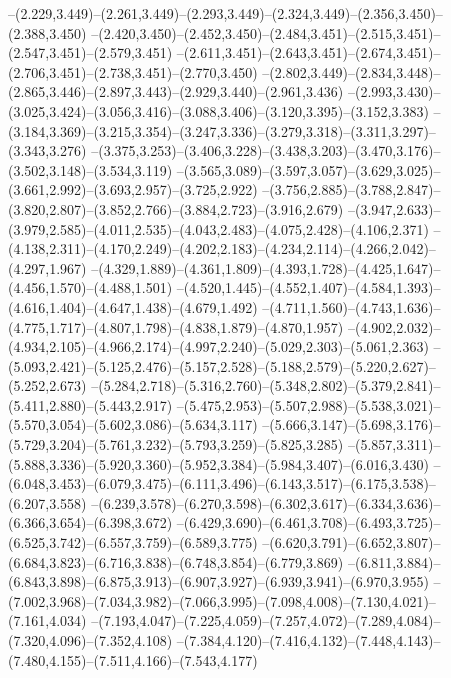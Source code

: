   --(2.229,3.449)--(2.261,3.449)--(2.293,3.449)--(2.324,3.449)--(2.356,3.450)--(2.388,3.450)%
  --(2.420,3.450)--(2.452,3.450)--(2.484,3.451)--(2.515,3.451)--(2.547,3.451)--(2.579,3.451)%
  --(2.611,3.451)--(2.643,3.451)--(2.674,3.451)--(2.706,3.451)--(2.738,3.451)--(2.770,3.450)%
  --(2.802,3.449)--(2.834,3.448)--(2.865,3.446)--(2.897,3.443)--(2.929,3.440)--(2.961,3.436)%
  --(2.993,3.430)--(3.025,3.424)--(3.056,3.416)--(3.088,3.406)--(3.120,3.395)--(3.152,3.383)%
  --(3.184,3.369)--(3.215,3.354)--(3.247,3.336)--(3.279,3.318)--(3.311,3.297)--(3.343,3.276)%
  --(3.375,3.253)--(3.406,3.228)--(3.438,3.203)--(3.470,3.176)--(3.502,3.148)--(3.534,3.119)%
  --(3.565,3.089)--(3.597,3.057)--(3.629,3.025)--(3.661,2.992)--(3.693,2.957)--(3.725,2.922)%
  --(3.756,2.885)--(3.788,2.847)--(3.820,2.807)--(3.852,2.766)--(3.884,2.723)--(3.916,2.679)%
  --(3.947,2.633)--(3.979,2.585)--(4.011,2.535)--(4.043,2.483)--(4.075,2.428)--(4.106,2.371)%
  --(4.138,2.311)--(4.170,2.249)--(4.202,2.183)--(4.234,2.114)--(4.266,2.042)--(4.297,1.967)%
  --(4.329,1.889)--(4.361,1.809)--(4.393,1.728)--(4.425,1.647)--(4.456,1.570)--(4.488,1.501)%
  --(4.520,1.445)--(4.552,1.407)--(4.584,1.393)--(4.616,1.404)--(4.647,1.438)--(4.679,1.492)%
  --(4.711,1.560)--(4.743,1.636)--(4.775,1.717)--(4.807,1.798)--(4.838,1.879)--(4.870,1.957)%
  --(4.902,2.032)--(4.934,2.105)--(4.966,2.174)--(4.997,2.240)--(5.029,2.303)--(5.061,2.363)%
  --(5.093,2.421)--(5.125,2.476)--(5.157,2.528)--(5.188,2.579)--(5.220,2.627)--(5.252,2.673)%
  --(5.284,2.718)--(5.316,2.760)--(5.348,2.802)--(5.379,2.841)--(5.411,2.880)--(5.443,2.917)%
  --(5.475,2.953)--(5.507,2.988)--(5.538,3.021)--(5.570,3.054)--(5.602,3.086)--(5.634,3.117)%
  --(5.666,3.147)--(5.698,3.176)--(5.729,3.204)--(5.761,3.232)--(5.793,3.259)--(5.825,3.285)%
  --(5.857,3.311)--(5.888,3.336)--(5.920,3.360)--(5.952,3.384)--(5.984,3.407)--(6.016,3.430)%
  --(6.048,3.453)--(6.079,3.475)--(6.111,3.496)--(6.143,3.517)--(6.175,3.538)--(6.207,3.558)%
  --(6.239,3.578)--(6.270,3.598)--(6.302,3.617)--(6.334,3.636)--(6.366,3.654)--(6.398,3.672)%
  --(6.429,3.690)--(6.461,3.708)--(6.493,3.725)--(6.525,3.742)--(6.557,3.759)--(6.589,3.775)%
  --(6.620,3.791)--(6.652,3.807)--(6.684,3.823)--(6.716,3.838)--(6.748,3.854)--(6.779,3.869)%
  --(6.811,3.884)--(6.843,3.898)--(6.875,3.913)--(6.907,3.927)--(6.939,3.941)--(6.970,3.955)%
  --(7.002,3.968)--(7.034,3.982)--(7.066,3.995)--(7.098,4.008)--(7.130,4.021)--(7.161,4.034)%
  --(7.193,4.047)--(7.225,4.059)--(7.257,4.072)--(7.289,4.084)--(7.320,4.096)--(7.352,4.108)%
  --(7.384,4.120)--(7.416,4.132)--(7.448,4.143)--(7.480,4.155)--(7.511,4.166)--(7.543,4.177)%
